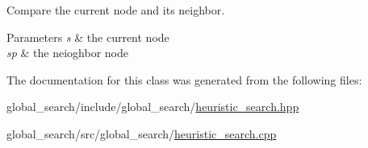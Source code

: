 Compare the current node and its neighbor. 


\begin{DoxyParams}{Parameters}
{\em s} & the current node \\
\hline
{\em sp} & the neioghbor node \\
\hline
\end{DoxyParams}


The documentation for this class was generated from the following files\+:\begin{DoxyCompactItemize}
\item 
global\+\_\+search/include/global\+\_\+search/\hyperlink{heuristic__search_8hpp}{heuristic\+\_\+search.\+hpp}\item 
global\+\_\+search/src/global\+\_\+search/\hyperlink{heuristic__search_8cpp}{heuristic\+\_\+search.\+cpp}\end{DoxyCompactItemize}
